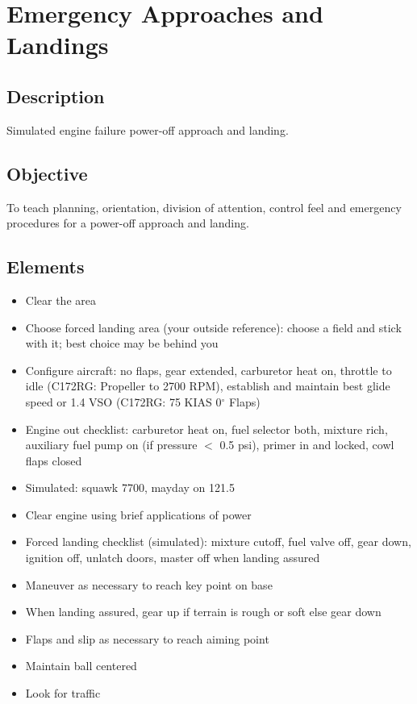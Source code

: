 \section{Emergency Approaches and Landings}

\subsection{Description}

Simulated engine failure power-off approach and landing.

\subsection{Objective}

To teach planning, orientation, division of attention, control feel and
emergency procedures for a power-off approach and landing.

\subsection{Elements}

\begin{itemize}
  \item Clear the area
  \item Choose forced landing area (your outside reference): choose a field and
    stick with it; best choice may be behind you
  \item Configure aircraft: no flaps, gear extended, carburetor heat on,
    throttle to idle (C172RG: Propeller to 2700 RPM), establish and maintain
    best glide speed or 1.4 VSO (C172RG: 75 KIAS 0$^\circ$ Flaps)
  \item Engine out checklist: carburetor heat on, fuel selector both, mixture
    rich, auxiliary fuel pump on (if pressure $<$ 0.5 psi), primer in and locked,
    cowl flaps closed
  \item Simulated: squawk 7700, mayday on 121.5
  \item Clear engine using brief applications of power
  \item Forced landing checklist (simulated): mixture cutoff, fuel valve off,
    gear down, ignition off, unlatch doors, master off when landing assured
  \item Maneuver as necessary to reach key point on base
  \item When landing assured, gear up if terrain is rough or soft else gear
    down
  \item Flaps and slip as necessary to reach aiming point
  \item Maintain ball centered 
  \item Look for traffic
\end{itemize}

